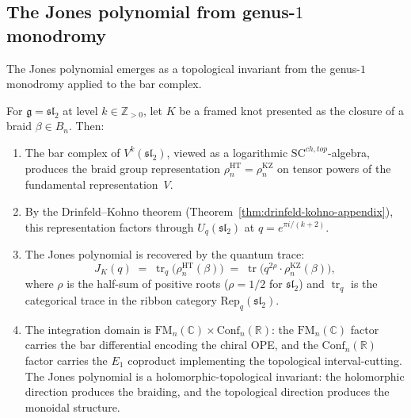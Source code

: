 \subsection{The Jones polynomial from genus-$1$ monodromy}
\label{sec:jones-genus1}

The Jones polynomial emerges as a topological invariant from the
genus-$1$ monodromy applied to the bar complex.

\begin{theorem}
\label{thm:jones-genus1}
For $\mathfrak{g} = \mathfrak{sl}_2$ at level $k \in \mathbb{Z}_{>0}$,
let $K$ be a framed knot presented as the closure of a braid
$\beta \in B_n$. Then:
\begin{enumerate}[label=\textup{(\roman*)}]
\item The bar complex of $V^k(\mathfrak{sl}_2)$, viewed as a
 logarithmic $\mathrm{SC}^{ch,top}$-algebra, produces the braid
 group representation $\rho_n^{\mathrm{HT}} = \rho_n^{\mathrm{KZ}}$
 on tensor powers of the fundamental representation~$V$.

\item By the Drinfeld--Kohno theorem
 \textup{(}Theorem~\textup{\ref{thm:drinfeld-kohno-appendix}}\textup{)},
 this representation factors through
 $U_q(\mathfrak{sl}_2)$ at $q = e^{\pi i/(k+2)}$.

\item The Jones polynomial is recovered by the quantum trace:
 \begin{equation}\label{eq:jones-from-bar}
 J_K(q)
 \;=\;
 \operatorname{tr}_q\bigl(\rho_n^{\mathrm{HT}}(\beta)\bigr)
 \;=\;
 \operatorname{tr}\bigl(q^{2\rho} \cdot \rho_n^{\mathrm{KZ}}(\beta)\bigr),
 \end{equation}
 where $\rho$ is the half-sum of positive roots
 \textup{(}$\rho = 1/2$ for $\mathfrak{sl}_2$\textup{)} and
 $\operatorname{tr}_q$ is the categorical trace in the ribbon
 category $\mathrm{Rep}_q(\mathfrak{sl}_2)$.

\item The integration domain is $\mathrm{FM}_n(\mathbb{C}) \times
 \mathrm{Conf}_n(\mathbb{R})$: the $\mathrm{FM}_n(\mathbb{C})$
 factor carries the bar differential encoding the chiral OPE, and the
 $\mathrm{Conf}_n(\mathbb{R})$ factor carries the $E_1$ coproduct
 implementing the topological interval-cutting. The Jones polynomial
 is a holomorphic-topological invariant: the holomorphic direction
 produces the braiding, and the topological direction produces the
 monoidal structure.
\end{enumerate}
\end{theorem}

